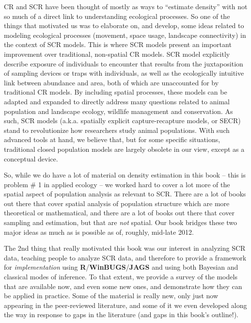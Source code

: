 CR and SCR have been thought of mostly as ways to ``estimate density''
with not so much of a direct link to understanding ecological
processes. So one of the things that motivated us was to elaborate on,
and develop, some ideas related to modeling ecological processes
(movement, space usage, landscape connectivity) in the context of SCR
models.  This is where SCR models present an important improvement
over traditional, non-spatial CR models.  SCR model explicitly
describe exposure of individuals to encounter that results from the
juxtaposition of sampling devices or traps with individuals, as well
as the ecologically intuitive link between abundance and area, both of
which are unaccounted for by traditional CR models. By including
spatial processes, these models can be adapted and expanded to
directly address many questions related to animal population and
landscape ecology, wildlife management and conservation.  As such, SCR
models (a.k.a.  spatially explicit capture-recapture models, or SECR)
stand to revolutionize how researchers study animal populations.  With
such advanced tools at hand, we believe that, but for some specific
situations, traditional closed population models are largely obsolete
in our view, except as a conceptual device.

So, while we do have a lot of material on density estimation in this
book -- this is problem \# 1 in applied ecology -- we worked hard to
cover a lot more of the spatial aspect of population analysis as
relevant to SCR.  There are a lot of books out there that cover
spatial analysis of population structure which are more theoretical or
mathematical, and there are a lot of books out there that cover
sampling and estimation, but that are {\it not} spatial. Our book
bridges these two major ideas as much as is possible as of, roughly,
mid-late 2012.

The 2nd thing that really motivated this book was our interest in
analyzing SCR data, teaching people to analyze SCR data, and
 therefore to provide a
framework for {\it implementation} using
\textbf{R}/\textbf{WinBUGS}/\textbf{JAGS} and using both Bayesian and
classical modes of inference.  To that extent, we provide a survey of
the models that are available now, and even some new ones, and
demonstrate how they can be applied in practice. Some of the material
is really new, only just now appearing in the peer-reviewed
literature, and some of it we even developed along the way in response to
gaps in the literature (and gaps in this book's outline!).

